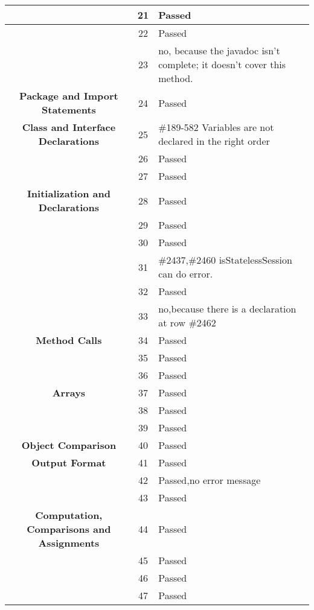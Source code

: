 \documentclass[11pt, a4paper,titlepage]{article}
\begin{document}
  \newpage
  \begin{tabularx}{\textwidth}{| c |c |X |}
  	\hline  & 21 & Passed \\
  	\hline  & 22 & Passed \\
  	\hline  & 23 & no, because the javadoc isn't complete; it doesn't cover this method. \\
  	\hline \textbf{Package and Import Statements} & 24 & Passed \\
  	\hline \textbf{Class and Interface Declarations} & 25 & \#189-582 Variables are not declared in the right order \\
  	\hline  & 26 & Passed \\
  	\hline  & 27 & Passed \\
  	\hline \textbf{Initialization and Declarations} & 28 & Passed \\
  	\hline  & 29 & Passed \\
  	\hline  & 30 & Passed \\
  	\hline  & 31 & \#2437,\#2460 isStatelessSession can do error.
  	\\
  	\hline  & 32 & Passed \\
  	\hline  & 33 & no,because there is a declaration at row \#2462 \\
  	\hline \textbf{Method Calls} & 34 & Passed \\
  	\hline  & 35 & Passed \\
  	\hline  & 36 & Passed \\
  	\hline \textbf{Arrays} & 37 & Passed \\
  	\hline  & 38 & Passed \\
  	\hline  & 39 & Passed \\
  	\hline \textbf{Object Comparison} & 40 & Passed \\
  	\hline \textbf{Output Format} & 41 & Passed \\
  	\hline  & 42 & Passed,no error message\\
  	\hline  & 43 & Passed \\
  	\hline \textbf{Computation, Comparisons and Assignments} & 44 & Passed \\
  	\hline  & 45 & Passed \\
  	\hline  & 46 & Passed \\
  	\hline  & 47 & Passed \\
  	\hline
  \end{tabularx}
  \newpage
\end{document}
